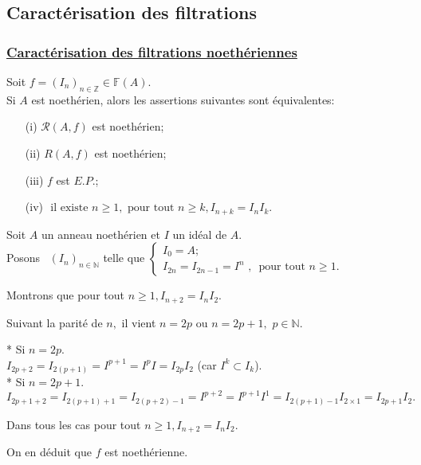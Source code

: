 \subsection{Caractérisation des filtrations}
\subsubsection{ \underline{Caractérisation des filtrations noethériennes}} 
\begin{maproposition}
	Soit $f=(I_{n})_{n \in \mathbb{Z}}\in \mathbb{F}(A).$ \\ Si $A$ est noethérien, alors les assertions suivantes sont équivalentes:
	\begin{enumerate}
		\item[(i)] $\mathcal{R}(A,f)$ est noethérien;
		\item[(ii)] $R(A,f)$ est noethérien;
		\item[(iii)] $f$ est $E.P.$;
		\item[(iv)] $\text{ il existe } n \geqslant 1,\text{ pour tout } n \geqslant k, I_{n+k} = I_nI_k$.
	\end{enumerate}
\end{maproposition}
\begin{monexemple}
	Soit $A$ un anneau noethérien et $I$ un idéal de $A$.\\
	Posons \ $(I_{n})_{n\in \mathbb{N}}$ telle que $\left\{ 
	\begin{array}{c}
		I_{0}=A ;\\ 
		I_{2n}=I_{2n-1}=I^{n}\text{ , }\text{ pour tout } n\geq 1.
	\end{array}
	\right. $
	
	Montrons que pour tout $n\geq 1,I_{n+2}=I_{n}I_{2}$.
	
	Suivant la parité de $n,$ il vient $n=2p$ ou $n=2p+1,$ $p\in \mathbb{N}.$
	
	* Si $n=2p$. \\
	$I_{2p+2}=I_{2(p+1)}=I^{p+1}=I^{p}I=I_{2p}I_{2}$ (car $I^{k}\subset I_{k}$). \\
	* Si $n=2p+1$. \\
	$I_{2p+1+2}=I_{2(p+1)+1}=I_{2(p+2)-1}=I^{p+2}=I^{p+1}I^{1}=I_{2(p+1)-1}I_{2\times 1}=I_{2p+1}I_{2}.$
	
	Dans tous les cas pour tout $n\geq 1,I_{n+2}=I_{n}I_{2}.$
	
	On en déduit que $f$ est noethérienne.
\end{monexemple}

